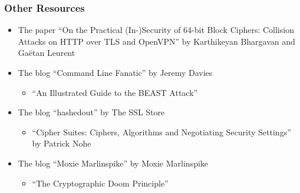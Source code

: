 \documentclass[aspectratio=169]{beamer}
\begin{document}
\begin{frame}[triangle=siiblue]
	\frametitle{Other Resources}
	\begin{itemize}
		\item The paper ``On the Practical (In-)Security of 64-bit Block Ciphers: Collision Attacks on HTTP over TLS and OpenVPN'' by Karthikeyan Bhargavan and Ga\"etan Leurent
		
		\vfill
				
		\item The blog ``Command Line Fanatic'' by Jeremy Davies
		\begin{itemize}
			\item ``An Illustrated Guide to the BEAST Attack''
		\end{itemize}
		
		\vfill
				
		\item The blog ``hashedout'' by The SSL Store
		\begin{itemize}
			\item ``Cipher Suites: Ciphers, Algorithms and Negotiating Security Settings'' by Patrick Nohe
		\end{itemize}
		
		\vfill
		
		\item The blog ``Moxie Marlinspike'' by Moxie Marlinspike
		\begin{itemize}
			\item ``The Cryptographic Doom Principle''
		\end{itemize}
	\end{itemize}
	
\end{frame}
\end{document}
